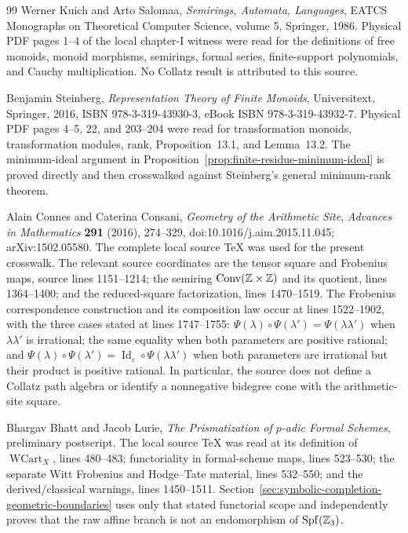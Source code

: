 \begin{thebibliography}{99}
Werner Kuich and Arto Salomaa,
\emph{Semirings, Automata, Languages},
EATCS Monographs on Theoretical Computer Science, volume 5,
Springer, 1986.
Physical PDF pages 1--4 of the local chapter-I witness were read for the
definitions of free monoids, monoid morphisms, semirings, formal series,
finite-support polynomials, and Cauchy multiplication.  No Collatz result is
attributed to this source.

Benjamin Steinberg,
\emph{Representation Theory of Finite Monoids},
Universitext, Springer, 2016,
ISBN 978-3-319-43930-3, eBook ISBN 978-3-319-43932-7.
Physical PDF pages 4--5, 22, and 203--204 were read for transformation
monoids, transformation modules, rank, Proposition~13.1, and Lemma~13.2.
The minimum-ideal argument in
Proposition~\ref{prop:finite-residue-minimum-ideal} is proved directly and
then crosswalked against Steinberg's general minimum-rank theorem.

Alain Connes and Caterina Consani,
\emph{Geometry of the Arithmetic Site},
\emph{Advances in Mathematics} \textbf{291} (2016), 274--329,
doi:10.1016/j.aim.2015.11.045; arXiv:1502.05580.
The complete local source \TeX{} was used for the present crosswalk.  The
relevant source coordinates are the tensor square and Frobenius maps,
source lines 1151--1214; the semiring
$\operatorname{Conv}(\mathbb{Z}\times\mathbb{Z})$ and its quotient, lines 1364--1400; and
the reduced-square factorization, lines 1470--1519.  The Frobenius
correspondence construction and its composition law occur at lines
1522--1902, with the three cases stated at lines 1747--1755:
$\Psi(\lambda)\circ\Psi(\lambda')=\Psi(\lambda\lambda')$ when
$\lambda\lambda'$ is irrational; the same equality when both parameters are
positive rational; and
$\Psi(\lambda)\circ\Psi(\lambda')=
\operatorname{Id}_{\varepsilon}\circ\Psi(\lambda\lambda')$ when both
parameters are irrational but their product is positive rational.  In
particular, the
source does not define a Collatz path algebra or identify a nonnegative
bidegree cone with the arithmetic-site square.

Bhargav Bhatt and Jacob Lurie,
\emph{The Prismatization of $p$-adic Formal Schemes},
preliminary postscript.
The local source \TeX{} was read at its definition of
$\operatorname{WCart}_X$, lines 480--483; functoriality in formal-scheme
maps, lines 523--530; the separate Witt Frobenius and Hodge--Tate material,
lines 532--550; and the derived/classical warnings, lines 1450--1511.
Section~\ref{sec:symbolic-completion-geometric-boundaries} uses only that
stated functorial scope and independently proves that the raw affine branch
is not an endomorphism of $\operatorname{Spf}(\mathbb{Z}_3)$.


\end{thebibliography}
